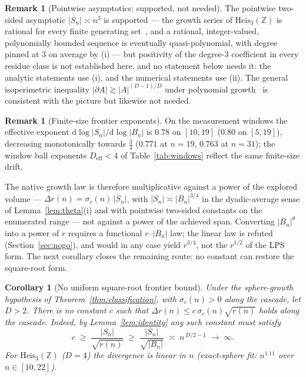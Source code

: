 \documentclass[11pt,a4paper]{article}
\newtheorem{corollary}[theorem]{Corollary}
\theoremstyle{definition}
\newtheorem{remark}[theorem]{Remark}
\newcommand{\Heis}{\mathrm{Heis}_3(\mathbb{Z})}
\begin{document}
\begin{remark}[Pointwise asymptotics: supported, not needed]
  \label{rem:theta-pointwise}
  The pointwise two-sided asymptotic $|S_n| \asymp n^3$ is supported --- the growth series of $\Heis$ is
  rational for every finite generating set~\cite{DuchinShapiro2014}, and a rational, integer-valued,
  polynomially bounded sequence is eventually quasi-polynomial, with degree pinned at $3$ on average by
  (i) --- but positivity of the degree-$3$ coefficient in every residue class is not established here, and
  no statement below needs it: the analytic statements use (i), and the numerical statements use (ii).
  The general isoperimetric inequality $|\partial A| \gtrsim |A|^{(D-1)/D}$ under polynomial
  growth~\cite{CoulhonSaloffCoste1993} is consistent with the picture but likewise not needed.
\end{remark}

\begin{remark}[Finite-size frontier exponents]
  \label{rem:theta-window}
  On the measurement windows the effective exponent
  $\mathrm{d}\log|S_n| / \mathrm{d}\log|B_n|$ is $0.78$ on $[10, 19]$ ($0.80$ on $[5, 19]$), decreasing
  monotonically towards $\tfrac34$ ($0.771$ at $n = 19$, $0.763$ at $n = 31$); the window ball exponents
  $D_{\mathrm{eff}} < 4$ of Table~\ref{tab:windows} reflect the same finite-size drift.
\end{remark}

The native growth law is therefore multiplicative against a power of the explored volume ---
$\Delta r(n) = \sigma_c(n)\,|S_n|$, with $|S_n| \asymp |B_n|^{3/4}$ in the dyadic-average sense of
Lemma~\ref{lem:theta}(i) and with pointwise two-sided constants on the enumerated range --- not against a
power of the achieved span.
Converting $|B_n|^{\theta}$ into a power of $r$ requires a functional $r$--$|B_n|$ law; the linear law is
refuted (Section~\ref{sec:nogo}), and would in any case yield $r^{3/4}$, not the $r^{1/2}$ of the LPS
form.
The next corollary closes the remaining route: no constant can restore the square-root form.

\begin{corollary}[No uniform square-root frontier bound]
  \label{cor:t3}
  Under the sphere-growth hypothesis of Theorem~\ref{thm:classification}, with $\sigma_c(n) > 0$ along the
  cascade, let $D > 2$.
  There is no constant $c$ such that
  $\Delta r(n) \le c\,\sigma_c(n)\sqrt{r(n)}$ holds along the cascade.
  Indeed, by Lemma~\ref{lem:identity} any such constant must satisfy
  \[
    c \;\ge\; \frac{|S_n|}{\sqrt{r(n)}} \;\ge\; \frac{|S_n|}{\sqrt{|B_n|}}
    \;\asymp\; n^{\,D/2 - 1} \;\longrightarrow\; \infty .
  \]
  For $\Heis$ ($D = 4$) the divergence is linear in $n$ (exact-sphere fit: $n^{1.11}$ over $n \in [10,22]$).
\end{corollary}
\end{document}
